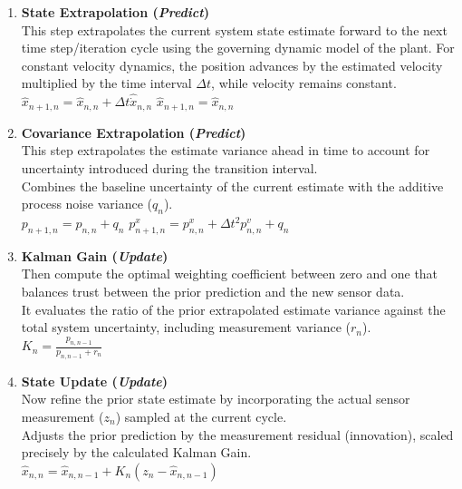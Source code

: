 \begin{enumerate}[label=\textbf{Step \arabic*:}, leftmargin=*, itemsep=1em]
	
	\item \textbf{State Extrapolation (\emph{Predict})}\\
	This step extrapolates the current system state estimate forward to the next time step/iteration cycle using the governing dynamic model of the plant. For constant velocity dynamics, the position advances by the estimated velocity multiplied by the time interval $\Delta t$, while velocity remains constant.\\
	$\hat{x}_{n+1,n} = \hat{x}_{n,n} + \Delta t \hat{\dot{x}}_{n,n}$ \quad {} $\hat{x}_{n+1,n} = \hat{x}_{n,n}$ 
	
	\item \textbf{Covariance Extrapolation (\emph{Predict})}\\
	This step extrapolates the estimate variance ahead in time to account for uncertainty introduced during the transition interval.%
	\\
	Combines the baseline uncertainty of the current estimate with the additive process noise variance ($q_n$).\\
	$p_{n+1,n} = p_{n,n} + q_n$ \quad {} $p_{n+1,n}^x = p_{n,n}^x + \Delta t^2 p_{n,n}^v + q_n$ 
	
	\item \textbf{Kalman Gain (\emph{Update})}\\
	Then compute the optimal weighting coefficient between zero and one that balances trust between the prior prediction and the new sensor data.\\
	 It evaluates the ratio of the prior extrapolated estimate variance against the total system uncertainty, including measurement variance ($r_n$).\\
	$K_n = \frac{p_{n,n-1}}{p_{n,n-1} + r_n}$
	
	\item \textbf{State Update (\emph{Update})}\\
	Now refine the prior state estimate by incorporating the actual sensor measurement ($z_n$) sampled at the current cycle.\\
	Adjusts the prior prediction by the measurement residual (innovation), scaled precisely by the calculated Kalman Gain.\\
	$\hat{x}_{n,n} = \hat{x}_{n,n-1} + K_n\left(z_n - \hat{x}_{n,n-1}\right)$
	

\end{enumerate}
